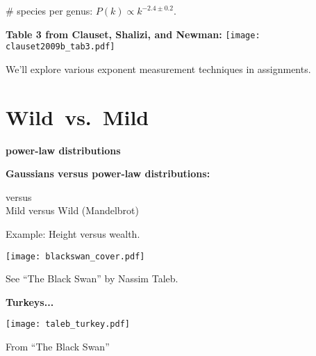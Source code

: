       \# species per genus:\cite{yule1924a,simon1955a,clauset2009b} 
      $P(k) \propto k^{-2.4 \pm 0.2}.$
    
  








  \textbf{Table 3 from Clauset, Shalizi, and Newman\cite{clauset2009b}:}
    \texttt{[image: clauset2009b\_tab3.pdf]}
  

  
   
    We'll explore various exponent measurement techniques in assignments.
  
  


\section{Wild\ vs.\ Mild}

  \textbf{power-law distributions}

  \textbf{Gaussians versus power-law distributions:}
    
    
       versus \\
    
      Mild versus Wild (Mandelbrot)
    
      Example: Height versus wealth.
    
  

  
          
      
      \texttt{[image: blackswan\_cover.pdf]}
      
      
       
        See ``The Black Swan'' by Nassim Taleb.\cite{taleb2007a}
      
      
      


  \textbf{Turkeys...}

  \begin{center}
    \texttt{[image: taleb\_turkey.pdf]}
  \end{center}

  {\small From ``The Black Swan''\cite{taleb2007a}}


